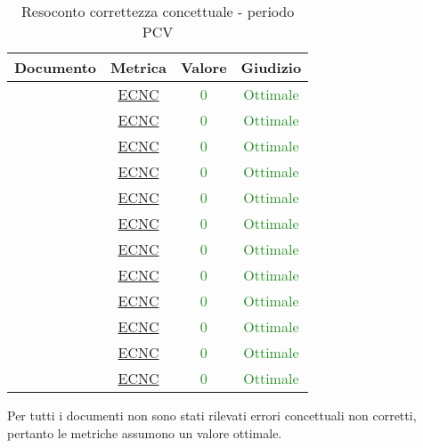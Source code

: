 							\begin{table}[H]
								\centering
								\small
								\begin{tabular}{c | c | c | c}
									\hline
									\textbf{Documento} & \textbf{Metrica}    & \textbf{Valore} & \textbf{Giudizio} \\ \hline
									\pdpvtre        & \hyperref[MLEC]{ECNC}  & \textcolor{ForestGreen}{0} & \textcolor{ForestGreen}{Ottimale} \\
									\pdqvtre        & \hyperref[MLEC]{ECNC} &  \textcolor{ForestGreen}{0} & \textcolor{ForestGreen}{Ottimale} \\
									\ndpvtre        & \hyperref[MLEC]{ECNC}  & \textcolor{ForestGreen}{0} & \textcolor{ForestGreen}{Ottimale} \\
									\adrvtre        & \hyperref[MLEC]{ECNC}   & \textcolor{ForestGreen}{0} & \textcolor{ForestGreen}{Ottimale} \\
									\stvdue		& \hyperref[MLEC]{ECNC}  & \textcolor{ForestGreen}{0} & \textcolor{ForestGreen}{Ottimale} \\
									\glvdue        & \hyperref[MLEC]{ECNC}  & \textcolor{ForestGreen}{0} & \textcolor{ForestGreen}{Ottimale} \\
									\ddpvuno        & \hyperref[MLEC]{ECNC}  & \textcolor{ForestGreen}{0} & \textcolor{ForestGreen}{Ottimale} \\
									\manutvuno        & \hyperref[MLEC]{ECNC}  & \textcolor{ForestGreen}{0} & \textcolor{ForestGreen}{Ottimale} \\
									\manmanvuno        & \hyperref[MLEC]{ECNC}  & \textcolor{ForestGreen}{0} & \textcolor{ForestGreen}{Ottimale} \\
									\vsesettei       & \hyperref[MLEC]{ECNC} & \textcolor{ForestGreen}{0} & \textcolor{ForestGreen}{Ottimale} \\
									\vottoi       & \hyperref[MLEC]{ECNC}  & \textcolor{ForestGreen}{0} & \textcolor{ForestGreen}{Ottimale} \\
									\vquattroe       & \hyperref[MLEC]{ECNC} & \textcolor{ForestGreen}{0} & \textcolor{ForestGreen}{Ottimale} \\
								\end{tabular}
								\caption{Resoconto correttezza concettuale - periodo PCV}
								\label{tab_resoconto_correttezza_concettuale_PPCV}
							\end{table}
							
							Per tutti i documenti non sono stati rilevati errori concettuali non corretti, pertanto le metriche assumono un valore ottimale.
				
